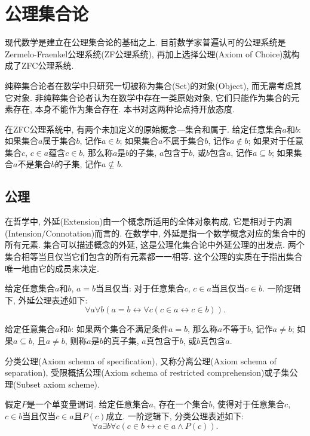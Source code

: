 \chapter{公理集合论}
现代数学是建立在公理集合论的基础之上. 目前数学家普遍认可的公理系统是Zermelo-Fraenkel公理系统(ZF公理系统), 再加上选择公理(Axiom of Choice)就构成了ZFC公理系统.

纯粹集合论者在数学中只研究一切被称为集合(Set)的对象(Object), 而无需考虑其它对象. 非纯粹集合论者认为在数学中存在一类原始对象, 它们只能作为集合的元素存在, 本身不能作为集合存在. 本书对这两种论点持开放态度.

在ZFC公理系统中, 有两个未加定义的原始概念---集合和属于. 给定任意集合$a$和$b$: 如果集合$a$属于集合$b$, 记作$a\in b$; 如果集合$a$不属于集合$b$, 记作$a\notin b$; 如果对于任意集合$c$, $c\in a$蕴含$c\in b$, 那么称$a$是$b$的子集, $a$包含于$b$, 或$b$包含$a$, 记作$a\subseteq b$; 如果集合$a$不是集合$b$的子集, 记作$a\nsubseteq b$.

\section{公理}
在哲学中, 外延(Extension)由一个概念所适用的全体对象构成, 它是相对于内涵(Intension/Connotation)而言的. 在数学中, 外延是指一个数学概念对应的集合中的所有元素. 集合可以描述概念的外延, 这是公理化集合论中外延公理的出发点. 两个集合相等当且仅当它们包含的所有元素都一一相等. 这个公理的实质在于指出集合唯一地由它的成员来决定.

\begin{axiom}[外延公理]
	给定任意集合$a$和$b$, $a=b$当且仅当: 对于任意集合$c$, $c\in a$当且仅当$c\in b$. 一阶逻辑下, 外延公理表述如下:
	\begin{equation}
		\forall a\forall b(a=b\leftrightarrow \forall c(c\in a\leftrightarrow c\in b)).
	\end{equation}
\end{axiom}

给定任意集合$a$和$b$: 如果两个集合不满足条件$a=b$, 那么称$a$不等于$b$, 记作$a\neq b$; 如果$a\subseteq b$, 且$a\neq b$, 则称$a$是$b$的真子集, $a$真包含于$b$, 或$b$真包含$a$.

分类公理(Axiom schema of specification), 又称分离公理(Axiom schema of separation), 受限概括公理(Axiom schema of restricted comprehension)或子集公理(Subset axiom scheme).

\begin{axiom}[分类公理]
	假定$P$是一个单变量谓词. 给定任意集合$a$, 存在一个集合$b$, 使得对于任意集合$c$, $c\in b$当且仅当$c\in a$且$P(c)$成立. 一阶逻辑下, 分类公理表述如下:
	\begin{equation}
		\forall a\exists b\forall c(c\in b\leftrightarrow c\in a\wedge P(c)).
	\end{equation}
\end{axiom}

